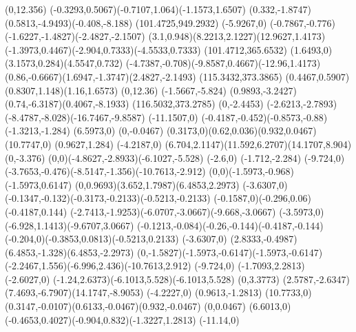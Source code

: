 {    \rlineto(0,12.356)
    \rcurveto(-0.3293,0.5067)(-0.7107,1.064)(-1.1573,1.6507)
    \rcurveto(0.332,-1.8747)(0.5813,-4.9493)(-0.408,-8.188)
    \moveto(101.4725,949.2932)
    \rlineto(-5.9267,0)
    \rcurveto(-0.7867,-0.776)(-1.6227,-1.4827)(-2.4827,-2.1507)
    \rcurveto(3.1,0.948)(8.2213,2.1227)(12.9627,1.4173)
    \rcurveto(-1.3973,0.4467)(-2.904,0.7333)(-4.5533,0.7333)
    \moveto(101.4712,365.6532)
    \rcurveto(1.6493,0)(3.1573,0.284)(4.5547,0.732)
    \rcurveto(-4.7387,-0.708)(-9.8587,0.4667)(-12.96,1.4173)
    \rcurveto(0.86,-0.6667)(1.6947,-1.3747)(2.4827,-2.1493)
    \closepath
    \moveto(115.3432,373.3865)
    \rcurveto(0.4467,0.5907)(0.8307,1.148)(1.16,1.6573)
    \rlineto(0,12.36)
    \rlineto(-1.5667,-5.824)
    \rcurveto(0.9893,-3.2427)(0.74,-6.3187)(0.4067,-8.1933)
    \moveto(116.5032,373.2785)
    \rlineto(0,-2.4453)
    \rcurveto(-2.6213,-2.7893)(-8.4787,-8.028)(-16.7467,-9.8587)
    \rlineto(-11.1507,0)
    \rcurveto(-0.4187,-0.452)(-0.8573,-0.88)(-1.3213,-1.284)
    \rlineto(6.5973,0)
    \rlineto(0,-0.0467)
    \rcurveto(0.3173,0)(0.62,0.036)(0.932,0.0467)
    \rlineto(10.7747,0)
    \rlineto(0.9627,1.284)
    \rlineto(-4.2187,0)
    \rcurveto(6.704,2.1147)(11.592,6.2707)(14.1707,8.904)
    \rlineto(0,-3.376)
    \rcurveto(0,0)(-4.8627,-2.8933)(-6.1027,-5.528)
    \rlineto(-2.6,0)
    \rlineto(-1.712,-2.284)
    \rlineto(-9.724,0)
    \rcurveto(-3.7653,-0.476)(-8.5147,-1.356)(-10.7613,-2.912)
    \rcurveto(0,0)(-1.5973,-0.968)(-1.5973,0.6147)
    \rcurveto(0,0.9693)(3.652,1.7987)(6.4853,2.2973)
    \rlineto(-3.6307,0)
    \rcurveto(-0.1347,-0.132)(-0.3173,-0.2133)(-0.5213,-0.2133)
    \rcurveto(-0.1587,0)(-0.296,0.06)(-0.4187,0.144)
    \rcurveto(-2.7413,-1.9253)(-6.0707,-3.0667)(-9.668,-3.0667)
    \rcurveto(-3.5973,0)(-6.928,1.1413)(-9.6707,3.0667)
    \rcurveto(-0.1213,-0.084)(-0.26,-0.144)(-0.4187,-0.144)
    \rcurveto(-0.204,0)(-0.3853,0.0813)(-0.5213,0.2133)
    \rlineto(-3.6307,0)
    \rcurveto(2.8333,-0.4987)(6.4853,-1.328)(6.4853,-2.2973)
    \rcurveto(0,-1.5827)(-1.5973,-0.6147)(-1.5973,-0.6147)
    \rcurveto(-2.2467,1.556)(-6.996,2.436)(-10.7613,2.912)
    \rlineto(-9.724,0)
    \rlineto(-1.7093,2.2813)
    \rlineto(-2.6027,0)
    \rcurveto(-1.24,2.6373)(-6.1013,5.528)(-6.1013,5.528)
    \rlineto(0,3.3773)
    \rcurveto(2.5787,-2.6347)(7.4693,-6.7907)(14.1747,-8.9053)
    \rlineto(-4.2227,0)
    \rlineto(0.9613,-1.2813)
    \rlineto(10.7733,0)
    \rcurveto(0.3147,-0.0107)(0.6133,-0.0467)(0.932,-0.0467)
    \rlineto(0,0.0467)
    \rlineto(6.6013,0)
    \rcurveto(-0.4653,0.4027)(-0.904,0.832)(-1.3227,1.2813)
    \rlineto(-11.14,0)
}
